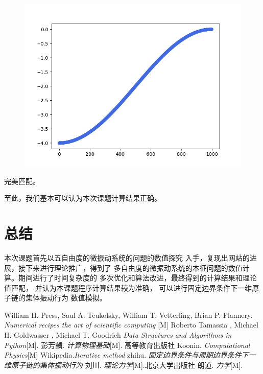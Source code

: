 \documentclass[11pt, a4paper, oneside]{ctexart}
\begin{document}
{{{\begin{figure}[H]
    \centering
    \vspace{2mm}
    \includegraphics[scale=0.45]{v-1000.png}
\end{figure} 
完美匹配。

至此，我们基本可以认为本次课题计算结果正确。
\newpage
\section{总结}
本次课题首先以五自由度的微振动系统的问题的数值探究
入手，复现出网站的进展，接下来进行理论推广，得到了
多自由度的微振动系统的本征问题的数值计算。期间进行了时间复杂度的
多次优化和算法改进，最终得到的计算结果和理论值匹配，
并认为本课题程序计算结果较为准确，
可以进行固定边界条件下一维原子链的集体振动行为
数值模拟。





\newpage

\begin{thebibliography}{99}
    William H. Press, Saul A. Teukolsky, William T. Vetterling, Brian P. Flannery. \emph{Numerical recipes the art of scientific computing }[M]
     Roberto Tamassia , Michael H. Goldwasser , Michael T. Goodrich  \emph{Data Structures and Algorithms in Python}[M].
    彭芳麟. \emph{计算物理基础}[M]. 高等教育出版社
    Koonin. \emph{Computational Physics}[M]
    Wikipedia.\emph{Iterative method}
    zhihu. \emph{固定边界条件与周期边界条件下一维原子链的集体振动行为}
    刘川. \emph{理论力学}[M].北京大学出版社
    朗道. \emph{力学}[M].
\end{thebibliography}

}}}
\end{document}
